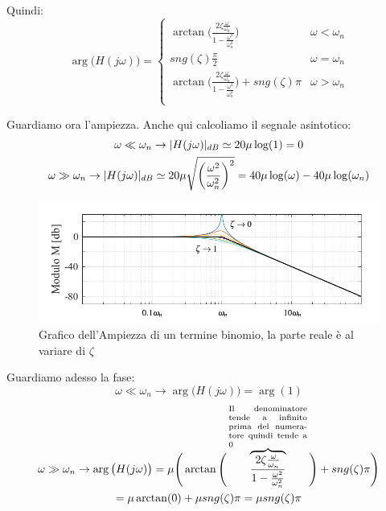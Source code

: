 Quindi:
\[ 
 	\arg\big(H(j\omega)\big) = 
 	\begin{cases}
	 	\arctan\Bigg(\frac{2\zeta\frac{\omega}{\omega_n}}{1-\frac{\omega^2}{\omega^{2}_{n}}}\Bigg) & \omega < \omega_n\\
	 	sng(\zeta)\frac{\pi}{2} &	\omega = \omega_n\\
	 	\arctan\Bigg(\frac{2\zeta\frac{\omega}{\omega_n}}{1-\frac{\omega^2}{\omega^{2}_{n}}}\Bigg)+ sng(\zeta)\pi & \omega > \omega_n\\
 	\end{cases}
\]
  
Guardiamo ora l'ampiezza. Anche qui calcoliamo il segnale asintotico:
\begin{gather*}
  	\omega \ll \omega_n \rightarrow \lvert H(j\omega)\rvert_{dB}\simeq 20\mu \log(1) = 0\\
  	\omega \gg \omega_n \rightarrow \lvert H(j\omega)\rvert_{dB}\simeq 20\mu \sqrt{	\bigg(\frac{\omega^2}{\omega^2_n}\bigg)^2} = 40\mu \log(\omega)-40 \mu \log(\omega_n)
\end{gather*}

\begin{figure}[H]
	\centering
	\includegraphics[width=0.7\linewidth]{immagini/cap6_Bode/bodeBin-Amp}
	\caption{Grafico dell'Ampiezza di un termine binomio, la parte reale è al variare di $ \zeta $}
	\label{fig:bodeBin-Amp}
\end{figure}

Guardiamo adesso la fase:
\begin{equation*}
	\omega \ll \omega_n \rightarrow \arg \big(H(j\omega)\big) = \arg(1)
\end{equation*}
\begin{multline*}
	\omega \gg \omega_n \rightarrow \arg \big(H(j\omega)\big) = \mu \Bigg(\arctan\Bigg(\overbrace{\frac{2\zeta\frac{\omega}{\omega_n}}{1-\frac{\omega^2}{\omega^{2}_{n}}}}^{\parbox{7
			em}{\scriptsize Il denominatore tende a infinito prima del numeratore quindi tende a 0}}\Bigg)+ sng(\zeta)\pi\Bigg) \\= \mu \arctan(0) + \mu sng(\zeta)\pi = \mu sng(\zeta)\pi
\end{multline*}

